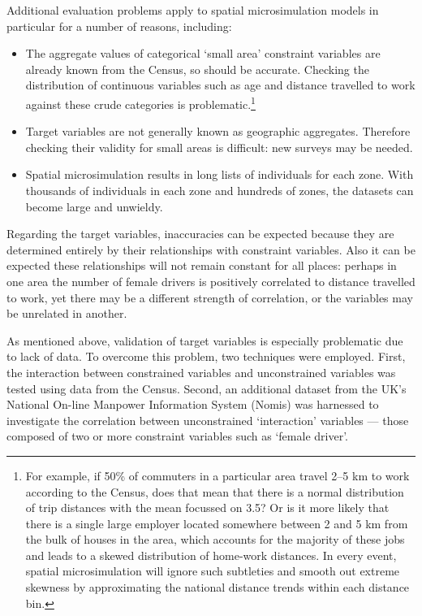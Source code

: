 \documentclass[a4paper, 11pt, twoside]{article}
\begin{document}
Additional evaluation problems apply to spatial microsimulation models in
particular for a number of reasons, including:
\begin{itemize}
 \item The aggregate values of categorical `small area' constraint variables are already known from the Census, 
 so should be accurate. Checking the distribution of continuous variables such as 
 age and distance travelled to work against these crude categories is 
 problematic.\footnote{For example, if 50\% of
commuters in a particular area travel 2--5 km to work according to the Census,
does that mean that there is a normal distribution of trip distances with the
mean focussed on 3.5? Or is it more likely that there is a single large
employer located somewhere between 2 and 5 km from the bulk of houses in the
area, which accounts for the majority of these jobs and leads to a skewed
distribution of home-work distances. In every event, spatial microsimulation
will ignore such subtleties and smooth out extreme skewness by approximating the
national distance trends within each distance bin.
}
  \item Target variables are not generally known as geographic
aggregates. Therefore checking their validity for small areas is 
difficult: new surveys may be needed.
  \item Spatial microsimulation results in long lists of individuals for each
zone. With thousands of individuals in each zone and hundreds of zones, the
datasets can become large and unwieldy.
\end{itemize}

Regarding the target variables, inaccuracies can be expected because they are
determined entirely by their relationships with constraint variables. Also
it can be expected these relationships will not remain constant for all places:
perhaps in one area the number of female drivers is positively correlated to
distance travelled to work, yet there may be a different strength of
correlation, or the variables may be unrelated in another.

As mentioned above, validation of target variables is especially problematic
due to lack of data. To overcome this problem, two techniques were employed.
First, the interaction between constrained variables and unconstrained
variables was tested using data from the Census. Second, an additional dataset
from the UK's National On-line Manpower Information System
(Nomis) was harnessed to investigate the
correlation between unconstrained `interaction' variables --- those
composed of two or more constraint variables such as `female driver'.
\end{document}
